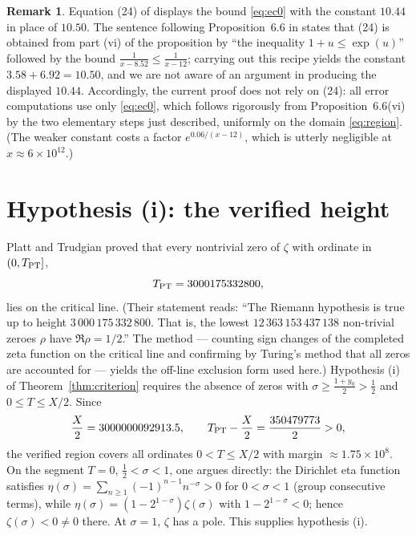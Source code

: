 \documentclass[11pt]{article}
\theoremstyle{definition}
\newtheorem{remark}[theorem]{Remark}
\begin{document}
\begin{remark}\label{rem:1044}
Equation (24) of \cite{Polymath} displays the bound \eqref{eq:ec0}
with the constant $10.44$ in place of $10.50$. The sentence following
Proposition~6.6 in \cite{Polymath} states that (24) is obtained from
part (vi) of the proposition by ``the inequality $1+u\le\exp(u)$''
followed by the bound $\frac{1}{x-8.52}\le\frac{1}{x-12}$; carrying
out this recipe yields the constant $3.58+6.92=10.50$, and we are not
aware of an argument in \cite{Polymath} producing the displayed
$10.44$. Accordingly, the current proof does not rely on (24): all
error computations use only
\eqref{eq:ec0}, which follows rigorously from Proposition~6.6(vi) by
the two elementary steps just described, uniformly on the domain
\eqref{eq:region}. (The weaker constant costs a factor
$e^{0.06/(x-12)}$, which is utterly negligible at
$x\approx6\times10^{12}$.)
\end{remark}

\section{Hypothesis (i): the verified height}\label{sec:hypi}

Platt and Trudgian \cite[Theorem~1]{PlattTrudgian} proved that every
nontrivial zero of $\zeta$ with ordinate in $(0,T_{\rm PT}]$,
\[
T_{\rm PT}=3000175332800,
\]
lies on the critical line. (Their statement reads: ``The Riemann
hypothesis is true up to height $3\,000\,175\,332\,800$. That is, the
lowest $12\,363\,153\,437\,138$ non-trivial zeroes $\rho$ have
$\Re\rho=1/2$.'' The method --- counting sign changes of the completed
zeta function on the critical line and confirming by Turing's method
that all zeros are accounted for --- yields the off-line exclusion
form used here.) Hypothesis (i) of
Theorem~\ref{thm:criterion} requires the absence of zeros with
$\sigma\ge\frac{1+y_0}2>\frac12$ and $0\le T\le X/2$. Since
\[
\frac X2=3000000092913.5,
\qquad
T_{\rm PT}-\frac X2=\frac{350479773}{2}>0,
\]
the verified region covers all ordinates $0<T\le X/2$ with margin
$\approx1.75\times10^8$. On the segment $T=0$, $\tfrac12<\sigma<1$,
one argues directly: the Dirichlet eta function satisfies
$\eta(\sigma)=\sum_{n\ge1}(-1)^{n-1}n^{-\sigma}>0$ for
$0<\sigma<1$ (group consecutive terms), while
$\eta(\sigma)=(1-2^{1-\sigma})\zeta(\sigma)$ with
$1-2^{1-\sigma}<0$; hence $\zeta(\sigma)<0\ne0$ there. At $\sigma=1$,
$\zeta$ has a pole. This supplies hypothesis (i).
\end{document}

